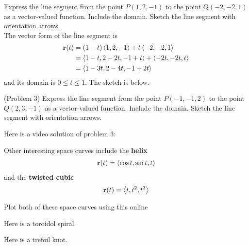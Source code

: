 \documentclass[handout]{ximera}
\begin{document}
\begin{example}[Example 3]
Express the line segment from the point $P(1, 2, -1)$ to the point $Q(-2, -2, 1)$ as a vector-valued function.  
Include the domain. Sketch the line segment with orientation arrows.\\
The vector form of the line segment is
\begin{align*}
    \mathbf r(t) &= (1-t)\left\langle 1, 2, -1\right\rangle + t \left\langle -2, -2, 1\right\rangle\\
              &= \left\langle 1-t, 2-2t, -1+t\right\rangle + \left\langle -2t, -2t, t\right\rangle\\
              &= \left\langle 1-3t, 2-4t, -1+2t\right\rangle
\end{align*}
and its domain is $0 \leq t \leq 1$. The sketch is below.




\begin{image}
\end{image}


\end{example}



\begin{problem}(Problem 3)
Express the line segment from the point $P(-1, -1, 2)$ to the point $Q(2, 3, -1)$ as a vector-valued function.  
Include the domain. Sketch the line segment with orientation arrows.
\end{problem}

Here is a video solution of problem 3:\\
\begin{foldable}
\end{foldable}

Other interesting space curves include the \textbf{helix}
\[
\mathbf r(t) = \left\langle \cos t, \sin t, t\right\rangle
\]
and the \textbf{twisted cubic}
\[
\mathbf r(t) = \left\langle t, t^2, t^3\right\rangle
\]

Plot both of these space curves using this online 

\begin{center}
\end{center}

Here is a toroidol spiral.

\begin{center}
\end{center}

Here is a trefoil knot.

\begin{center}
\end{center}
\end{document}
